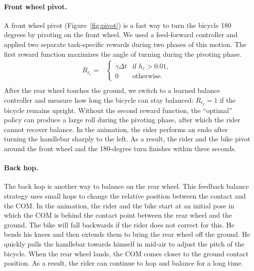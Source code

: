 \paragraph{Front wheel pivot.} A front wheel pivot (Figure~\ref{fig:pivot}) is a fast way to turn the bicycle 180 degrees by pivoting on the front wheel. We used a feed-forward controller and applied two separate task-specific rewards during two phases of this motion. The first reward function maximizes the angle of turning during the pivoting phase.
\begin {displaymath}
\begin{array}{ll}
R_{t_1} = & \left\{ \begin{array}{ll}
\dot{\gamma} \Delta t & \textrm{if }h_r > 0.01,\\
0 & \textrm{otherwise.}
\end{array} \right. \\
\end{array}
\end {displaymath}
After the rear wheel touches the ground, we switch to a learned balance controller and measure how long the bicycle can stay balanced: $R_{t_2}=1$ if the bicycle remains upright. Without the second reward function, the ``optimal'' policy can produce a large roll during the pivoting phase, after which the rider cannot recover balance. In the animation, the rider performs an endo after turning the handlebar sharply to the left. As a result, the rider and the bike pivot around the front wheel and the 180-degree turn finishes within three seconds.
\vspace{-0.05in}

\paragraph {Back hop.} The back hop is another way to balance on the rear wheel. This feedback balance strategy uses small hops to change the relative position between the contact and the COM. In the animation, the rider and the bike start at an initial pose in which the COM is behind the contact point between the rear wheel and the ground. The bike will fall backwards if the rider does not correct for this. He bends his knees and then extends them to bring the rear wheel off the ground. He quickly pulls the handlebar towards himself in mid-air to adjust the pitch of the bicycle. When the rear wheel lands, the COM comes closer to the ground contact position. As a result, the rider can continue to hop and balance for a long time.
\vspace{-0.05in}


